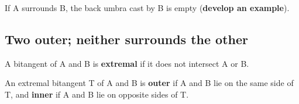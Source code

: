 \documentclass[12pt]{article}
\newif\ifCommentary             %
\begin{document}
\begin{lemma}
If A surrounds B, the back umbra cast by B is empty ({\bf develop an example}).
\end{lemma}

\clearpage

\subsection{Two outer; neither surrounds the other}

\begin{defn2}
\label{defn:extremal}
A bitangent of A and B is {\bf extremal} if it does not intersect A or 
B.\ifCommentary\footnote{Clearly, points of tangency are not counted as intersections.}\fi
\end{defn2}

\begin{defn2}
\label{defn:outerbitang}
An extremal bitangent T of A and B is {\bf outer} if A and B lie on the same side of T,
and {\bf inner} if A and B lie on opposite sides of T.
\end{defn2}

\ifCommentary
In the literature, inner and outer bitangents may be called
separating and supporting bitangents, respectively.
We find the terms 'inner' and 'outer' more suggestive for the work of this paper,
especially later when these bitangents are incorporated into sweeps.
Note that each outer bitangent of A and B defines a halfspace containing A and B.

{\em Figure of bitangents, extremal bitangents, outer bitangents and inner bitangents 
in the typical case (perhaps Figure~\ref{fig:outer} and~\ref{fig:innersweep}b-c).}
\fi

\vspace{.3in}
\end{document}
